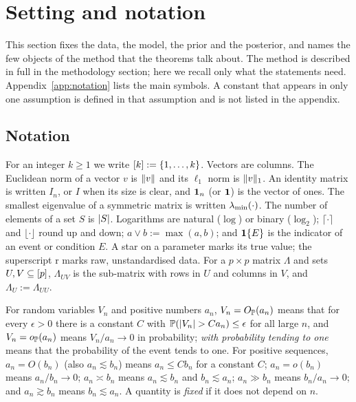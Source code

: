 \section{Setting and notation}\label{sec:setting}

This section fixes the data, the model, the prior and the posterior, and names the few objects of the method that the
theorems talk about. The method is described in full in the methodology section; here we recall only what the statements
need. Appendix~\ref{app:notation} lists the main symbols. A constant that appears in only one assumption is defined in
that assumption and is not listed in the appendix.

\subsection{Notation}\label{sec:notation}

For an integer $k\ge1$ we write $[k]:=\{1,\dots,k\}$. Vectors are columns. The Euclidean norm of a vector $v$ is
$\lVert v\rVert$ and its $\ell_1$ norm is $\lVert v\rVert_1$. An identity matrix is written $I_n$, or $I$ when its size is clear,
and $\mathbf{1}_n$ (or $\mathbf{1}$) is the vector of ones. The smallest eigenvalue of a symmetric matrix is written $\lambda_{\min}(\cdot)$.
The number of elements of a set $S$ is $\lvert S\rvert$. Logarithms are natural ($\log$) or binary ($\log_2$);
$\lceil\cdot\rceil$ and $\lfloor\cdot\rfloor$ round up and down; $a\vee b:=\max(a,b)$; and $\mathbf{1}\{E\}$ is the indicator of
an event or condition $E$. A star on a parameter marks its true value; the superscript $\mathrm r$ marks raw,
unstandardised data. For a $p\times p$ matrix $\Lambda$ and sets $U,V\subseteq[p]$, $\Lambda_{UV}$ is the sub-matrix
with rows in $U$ and columns in $V$, and $\Lambda_U:=\Lambda_{UU}$.

For random variables $V_n$ and positive numbers $a_n$, $V_n=O_{\mathbb{P}}(a_n)$ means that for every $\epsilon>0$ there is a
constant $C$ with $\mathbb{P}(\lvert V_n\rvert>Ca_n)\le\epsilon$ for all large $n$, and $V_n=o_{\mathbb{P}}(a_n)$ means $V_n/a_n\to0$ in
probability; \emph{with probability tending to one} means that the probability of the event tends to one. For positive
sequences, $a_n=O(b_n)$ (also $a_n\lesssim b_n$) means $a_n\le Cb_n$ for a constant $C$; $a_n=o(b_n)$ means
$a_n/b_n\to0$; $a_n\asymp b_n$ means $a_n\lesssim b_n$ and $b_n\lesssim a_n$; $a_n\gg b_n$ means $b_n/a_n\to0$; and
$a_n\gtrsim b_n$ means $b_n\lesssim a_n$. A quantity is \emph{fixed} if it does not depend on $n$.

